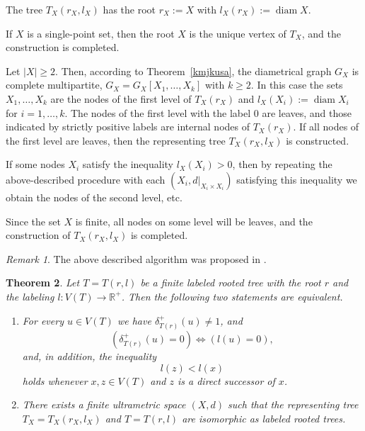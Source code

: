 \documentclass{raex}
\newtheorem{thm}{Theorem}[section]
\theoremstyle{definition}
\theoremstyle{remark}
\newtheorem{rem}[thm]{Remark}
\numberwithin{equation}{section}
\begin{document}
 
 
 The tree $T_X(r_X,l_X)$ has the root 
 $r_X:=X$ with 
 \(
 l_X(r_X):=\operatorname{diam} X.
 \)


If $X$ is a single-point set, then the root $X$ is the unique vertex of $T_X$, and the construction is completed.


Let $|X|\ge 2$. Then, according to Theorem~\ref{kmjkusa}, the diametrical graph $G_X$ is complete multipartite,
\(
G_{X}=G_{X}[X_1,\ldots,X_k]
\)
with $k\ge 2$. In this case the sets $X_1,\ldots,X_k$ are the nodes of the first level of $T_X(r_X)$ and
\(
l_X(X_i):=\operatorname{diam}X_i
\)
for $i=1,\ldots,k.$
The nodes of the first level with the label $0$ are leaves, and those indicated by strictly positive labels are internal nodes of $T_X(r_X)$. If all nodes of the first level are leaves, then the representing tree $T_X(r_X,l_X)$ is constructed. 

If some nodes $X_i$ satisfy the inequality $l_X(X_i)>0$, then by repeating the above-described procedure with each $(X_i,d |_{X_i \times X_i})$ satisfying this inequality
 we obtain the nodes of the second level, etc. 
 
 Since the set $X$ is finite, all nodes on some level will be leaves, and the construction of $T_X(r_X,l_X)$ is completed.

\begin{rem}\label{bvy}
    The above described algorithm 
 was proposed in \cite{PD2014JMS}.
\end{rem}





 

\begin{thm}\label{hds11}
Let $T=T(r,l)$ be a finite labeled rooted tree with the root $r$
and the labeling $l:V(T)\to \mathbb{R}^{+}$.
Then the following two statements are equivalent.

\begin{enumerate}
\item[(i)]
For every $u\in V(T)$ we have $\delta_{T(r)}^{+}(u)\neq 1$, and
\[
(\delta_{T(r)}^{+}(u)=0)\iff (l(u)=0),
\]
and, in addition, the inequality
\begin{equation*}
l(z)<l(x)
\end{equation*}
holds whenever $x,z\in V(T)$ and $z$ is a direct successor of $x$.

\item[(ii)]
There exists a finite ultrametric space $(X,d)$ such that the representing
tree $T_X=T_X(r_X,l_X)$ and $T=T(r,l)$ are isomorphic as labeled rooted trees.
\end{enumerate}
\end{thm}
\end{document}
